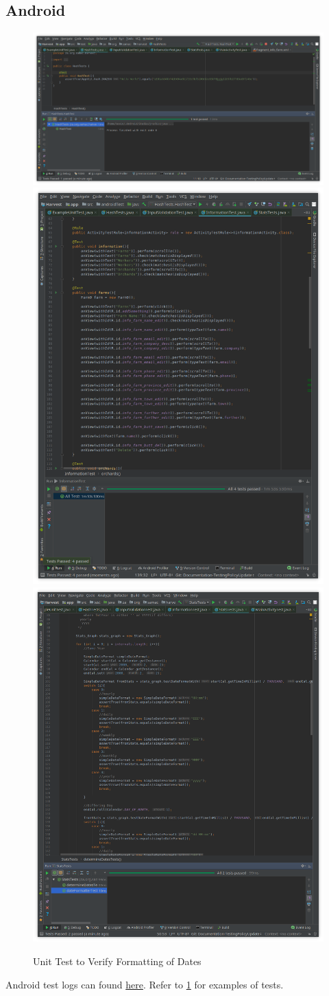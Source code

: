 \documentclass[12pt]{article}
\begin{document}
\subsection{Android}
\begin{figure}[ht!]
            \includegraphics[width=.3\textwidth]{images/hash.png}
            \includegraphics[width=.3\textwidth]{images/info.png}
            \includegraphics[width=.3\textwidth]{images/stats.png}
            \caption{Unit Test to Verify Functioning of Hash Function}
            \caption{UI Test to Verify Functioning of Information Editing}
            \caption{Unit Test to Verify Formatting of Dates}
            \label{fig:androidsamples}
        \end{figure}
Android test logs can found \href{https://github.com/BinaryNinjaz/COS301-Capstone/tree/master/Source/Android/Harvest/test-logs}{here}. Refer to \ref{fig:androidsamples} for examples of tests.
\end{document}
